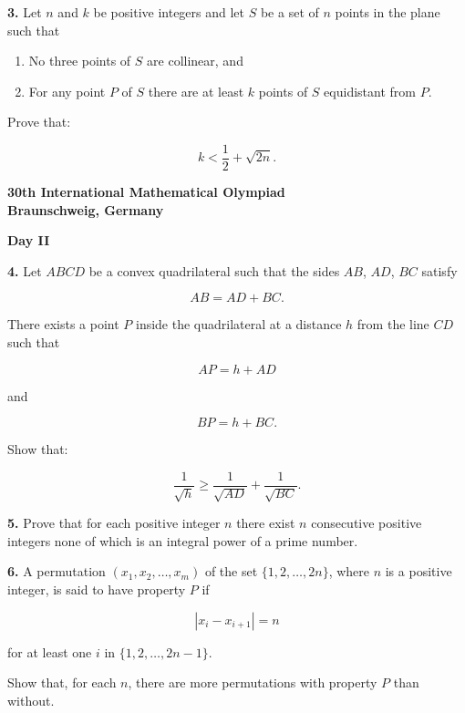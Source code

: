 \documentclass[12pt]{article}
\begin{document}
\vspace{0.3cm}

\noindent
\textbf{3.} Let $n$ and $k$ be positive integers and let $S$ be a set of $n$ points in the plane such
that

\begin{enumerate}
\item[(i)] No three points of $S$ are collinear, and
\item[(ii)] For any point $P$ of $S$ there are at least $k$ points of $S$ equidistant from $P$.
\end{enumerate}

Prove that:

\[
k < \frac{1}{2} + \sqrt{2n}.
\]

\newpage

\begin{center}
{\Large \textbf{30th International Mathematical Olympiad}}\\
\textbf{Braunschweig, Germany}
\end{center}

\vspace{0.5cm}

\begin{center}
\textbf{\large Day II}
\end{center}

\vspace{0.3cm}

\noindent
\textbf{4.} Let $ABCD$ be a convex quadrilateral such that the sides $AB$, $AD$, $BC$ satisfy

\[
AB = AD + BC.
\]

There exists a point $P$ inside the quadrilateral at a distance
$h$ from the line $CD$ such that

\[
AP = h + AD
\]

and

\[
BP = h + BC.
\]

Show that:

\[
\frac{1}{\sqrt{h}}
\geq
\frac{1}{\sqrt{AD}}
+
\frac{1}{\sqrt{BC}}.
\]

\vspace{0.3cm}

\noindent
\textbf{5.} Prove that for each positive integer $n$ there exist $n$
consecutive positive integers none of which is an integral power
of a prime number.

\vspace{0.3cm}

\noindent
\textbf{6.} A permutation $(x_1, x_2, \ldots , x_m)$ of the set
$\{1, 2, \ldots , 2n\}$, where $n$ is a positive integer,
is said to have property $P$ if

\[
|x_i - x_{i+1}| = n
\]

for at least one $i$ in
$\{1, 2, \ldots , 2n - 1\}$.

Show that, for each $n$,
there are more permutations with property $P$ than without.
\end{document}

